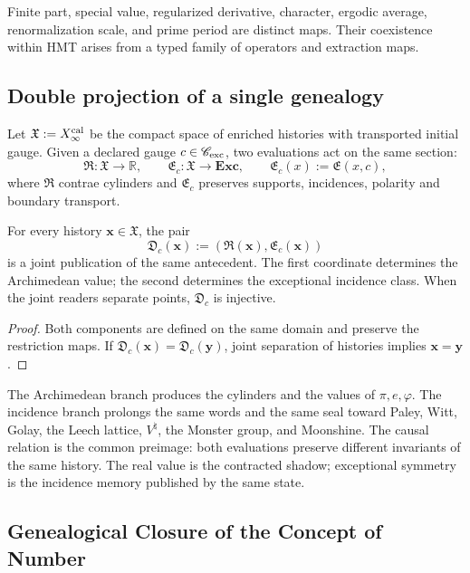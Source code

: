 Finite part, special value, regularized derivative, character, ergodic
average, renormalization scale, and prime period are distinct maps. Their
coexistence within HMT arises from a typed family of operators and
extraction maps.

\subsection{Double projection of a single genealogy}

Let \(\mathfrak X:=X_\infty^{\rm cal}\) be the compact space of enriched
histories with transported initial gauge. Given a declared gauge
\(c\in\mathscr C_{\rm exc}\), two evaluations act on the same
section:
\[
 \mathfrak R:\mathfrak X\longrightarrow\mathbb R,
 \qquad
 \mathfrak E_c:\mathfrak X\longrightarrow\mathbf{Exc},
 \qquad
 \mathfrak E_c(x):=\mathfrak E(x,c),
\]
where \(\mathfrak R\) contrae cylinders and \(\mathfrak E_c\) preserves supports,
incidences, polarity and boundary transport.

\begin{theorem}
\label{p3-83-c44-s2:thm:unidad-causal-doble-proyeccion-numero}
For every history \(\boldsymbol x\in\mathfrak X\), the pair
\[
 \mathfrak D_c(\boldsymbol x)
 :=(\mathfrak R(\boldsymbol x),\mathfrak E_c(\boldsymbol x))
\]
is a joint publication of the same antecedent. The first coordinate
determines the Archimedean value; the second determines the exceptional incidence
class. When the joint readers separate points,
\(\mathfrak D_c\) is injective.
\end{theorem}

\begin{proof}
Both components are defined on the same domain and preserve the
restriction maps. If
\(\mathfrak D_c(\boldsymbol x)=\mathfrak D_c(\boldsymbol y)\), joint separation
of histories implies \(\boldsymbol x=\boldsymbol y\).
\end{proof}

The Archimedean branch produces the cylinders and the values of \(\pi,e,\varphi\). The incidence branch prolongs the same words and the same seal toward Paley, Witt, Golay, the Leech lattice, \(V^\natural\), the Monster group, and Moonshine. The causal relation is the common preimage: both evaluations preserve different invariants of the same history. The real value is the contracted shadow; exceptional symmetry is the incidence memory published by the same state.

\subsection{Genealogical Closure of the Concept of Number}

